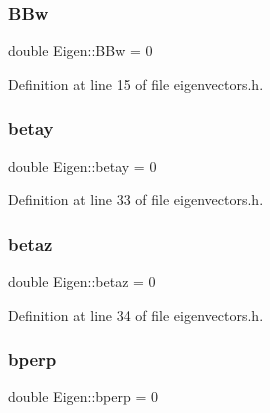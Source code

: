 \mbox{\label{classEigen_a13064097603eadd4b2efd4000800b640}} 
\subsubsection{\texorpdfstring{B\+Bw}{BBw}}
{\footnotesize\ttfamily double Eigen\+::\+B\+Bw = 0\hspace{0.3cm}{\ttfamily [private]}}



Definition at line 15 of file eigenvectors.\+h.

\mbox{\label{classEigen_a56747b8f4e73bb7e64cfaace007931e2}} 
\subsubsection{\texorpdfstring{betay}{betay}}
{\footnotesize\ttfamily double Eigen\+::betay = 0\hspace{0.3cm}{\ttfamily [private]}}



Definition at line 33 of file eigenvectors.\+h.

\mbox{\label{classEigen_a47a0a29c382be902fcabe92d37ba5500}} 
\subsubsection{\texorpdfstring{betaz}{betaz}}
{\footnotesize\ttfamily double Eigen\+::betaz = 0\hspace{0.3cm}{\ttfamily [private]}}



Definition at line 34 of file eigenvectors.\+h.

\mbox{\label{classEigen_acdb30615460d877c80b0005f15ffcc49}} 
\subsubsection{\texorpdfstring{bperp}{bperp}}
{\footnotesize\ttfamily double Eigen\+::bperp = 0\hspace{0.3cm}{\ttfamily [private]}}



